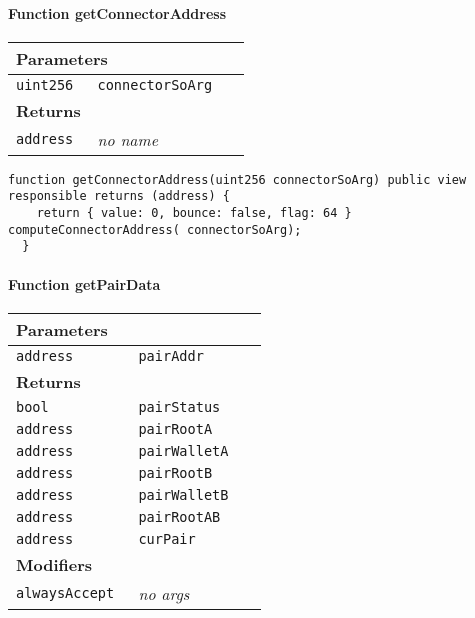 \paragraph{Function getConnectorAddress}


\ifsoltables
\noindent\begin{tabular}{|l|l|p{5cm}|}\hline
\multicolumn{3}{|l|}{\bf Parameters}\\\hline
\tt uint256 & \tt connectorSoArg &\\\hline
\multicolumn{3}{|l|}{\bf Returns}\\\hline
\tt address & {\em no name} &\\\hline
\end{tabular}
\fi

\vspace{2cm}

\begin{lstlisting}[firstnumber=153]
  function getConnectorAddress(uint256 connectorSoArg) public view responsible returns (address) {
    return { value: 0, bounce: false, flag: 64 } computeConnectorAddress( connectorSoArg);
  }
\end{lstlisting}

\paragraph{Function getPairData}


\ifsoltables
\noindent\begin{tabular}{|l|l|p{5cm}|}\hline
\multicolumn{3}{|l|}{\bf Parameters}\\\hline
\tt address & \tt pairAddr &\\\hline
\multicolumn{3}{|l|}{\bf Returns}\\\hline
\tt bool & \tt pairStatus &\\\hline
\tt address & \tt pairRootA &\\\hline
\tt address & \tt pairWalletA &\\\hline
\tt address & \tt pairRootB &\\\hline
\tt address & \tt pairWalletB &\\\hline
\tt address & \tt pairRootAB &\\\hline
\tt address & \tt curPair &\\\hline
\multicolumn{3}{|l|}{\bf Modifiers}\\\hline
\tt alwaysAccept & {\em no args} &\\\hline
\end{tabular}
\fi

